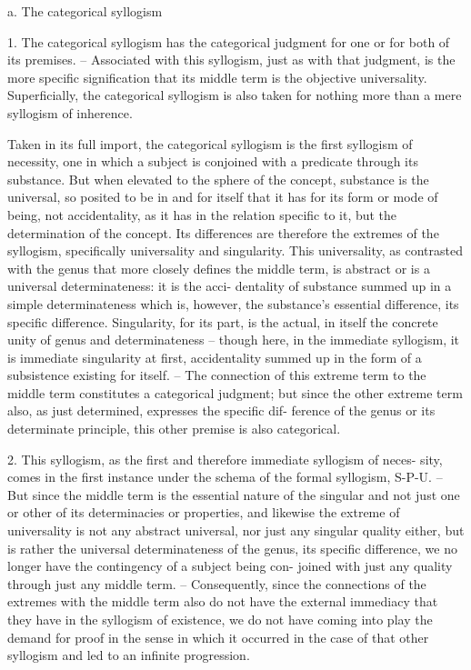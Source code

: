 a. The categorical syllogism

1. The categorical syllogism has the categorical judgment for one or for
both of its premises.
– Associated with this syllogism, just as with that
judgment, is the more specific signification that its middle term is the
objective universality.
Superficially, the categorical syllogism is also taken
for nothing more than a mere syllogism of inherence.

Taken in its full import, the categorical syllogism is the first syllogism
of necessity, one in which a subject is conjoined with a predicate through
its substance.
 But when elevated to the sphere of the concept, substance
is the universal, so posited to be in and for itself that it has for its form
or mode of being, not accidentality, as it has in the relation specific to
it, but the determination of the concept.
 Its differences are therefore the
extremes of the syllogism, specifically universality and singularity. This
universality, as contrasted with the genus that more closely defines the
middle term, is abstract or is a universal determinateness: it is the acci-
dentality of substance summed up in a simple determinateness which
is, however, the substance's essential difference, its specific difference.
Singularity, for its part, is the actual, in itself the concrete unity of genus
and determinateness –
 though here, in the immediate syllogism, it is
immediate singularity at first, accidentality summed up in the form of
a subsistence existing for itself.
– The connection of this extreme term
to the middle term constitutes a categorical judgment; but since the
other extreme term also, as just determined, expresses the specific dif-
ference of the genus or its determinate principle, this other premise is also
categorical.

2. This syllogism, as the first and therefore immediate syllogism of neces-
sity, comes in the first instance under the schema of the formal syllogism,
S-P-U.
– But since the middle term is the essential nature of the singular
and not just one or other of its determinacies or properties, and likewise the
extreme of universality is not any abstract universal, nor just any singular
quality either, but is rather the universal determinateness of the genus, its
specific difference, we no longer have the contingency of a subject being con-
joined with just any quality through just any middle term.
– Consequently,
since the connections of the extremes with the middle term also do not
have the external immediacy that they have in the syllogism of existence,
we do not have coming into play the demand for proof in the sense in
which it occurred in the case of that other syllogism and led to an infinite
progression.


